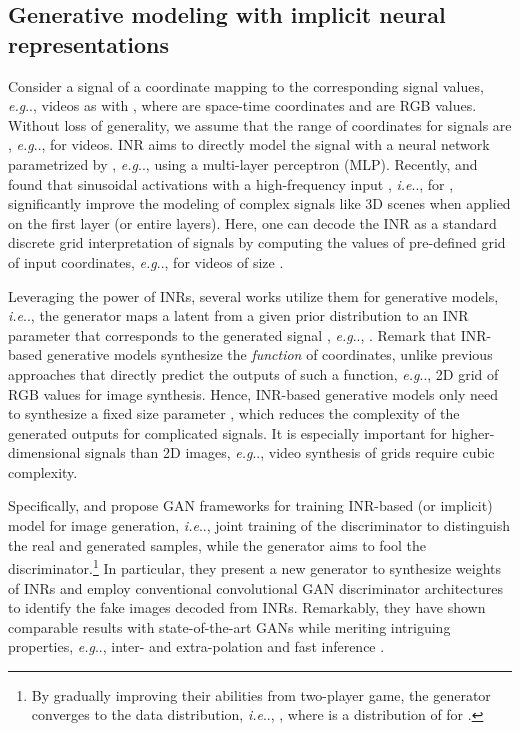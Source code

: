 \documentclass{article} \usepackage{iclr2022_conference,times}
\makeatletter
\DeclareRobustCommand\onedot{\futurelet\@let@token\@onedot}
\def\@onedot{\ifx\@let@token.\else.\null\fi\xspace}
\def\eg{\emph{e.g}\onedot} \def\Eg{\emph{E.g}\onedot}
\def\ie{\emph{i.e}\onedot} \def\Ie{\emph{I.e}\onedot}
\makeatother
\begin{document}
\subsection{Generative modeling with implicit neural representations}
\label{subsec:method-inr}

Consider a signal  of a coordinate mapping to the corresponding signal values, \eg, videos as  with , where  are space-time coordinates and  are RGB values. Without loss of generality, we assume that the range of coordinates for signals are , \eg,  for videos. INR aims to directly model the signal with a neural network  parametrized by , \eg, using a multi-layer perceptron (MLP). Recently, \citet{tancik2020fourier} and \citet{sitzmann2020implicit} found that sinusoidal activations with a high-frequency input , \ie,  for , significantly improve the modeling of complex signals like 3D scenes \citep{mildenhall2020nerf}
when applied on the first layer (or entire layers). Here, one can decode the INR  as a standard discrete grid interpretation of signals by computing the values of pre-defined grid of input coordinates, \eg,  for videos of size .

Leveraging the power of INRs, several works utilize them for generative models, \ie, the generator  maps a latent  from a given prior distribution  to an INR parameter  that corresponds to the generated signal , \eg, \citet{chan2021pi}. Remark that INR-based generative models synthesize the \emph{function} of coordinates, unlike previous approaches that directly predict the outputs of such a function, \eg, 2D grid of RGB values for image synthesis. Hence, INR-based generative models only need to synthesize a fixed size parameter , which reduces the complexity of the generated outputs for complicated signals. It is especially important for higher-dimensional signals than 2D images, \eg, video synthesis of grids require cubic complexity.

Specifically, \citet{skorokhodov2021adversarial} and \citet{anokhin2021image} propose GAN frameworks for training INR-based (or implicit) model for image generation, \ie, joint training of the discriminator  to distinguish the real and generated samples, while the generator  aims to fool the discriminator.\footnote{By gradually improving their abilities from two-player game, the generator converges to the data distribution, \ie, , where  is a distribution of  for  \citep{mescheder2018training}.}
In particular, they present a new generator to synthesize weights of INRs and employ conventional convolutional GAN discriminator architectures to identify the fake images decoded from INRs. Remarkably, they have shown comparable results with state-of-the-art GANs while meriting intriguing properties, \eg, inter- and extra-polation and fast inference \citep{skorokhodov2021adversarial}.
\end{document}

